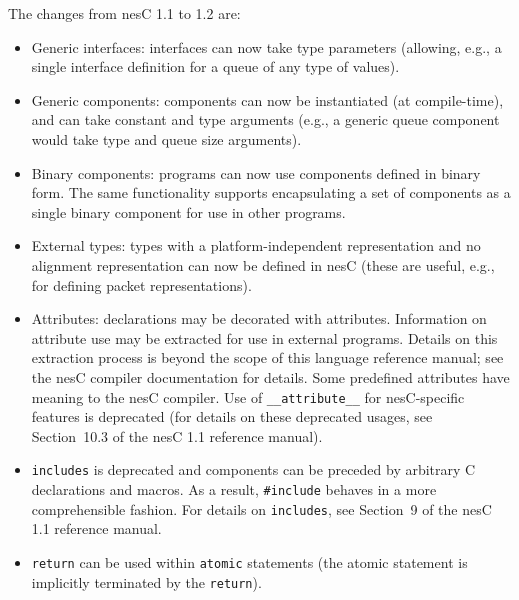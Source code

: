\documentclass[11pt,letterpaper]{article}
\newcommand{\kw}[1]{{\tt #1}}
\newcommand{\nesc}{nesC\xspace}
\begin{document}
The changes from \nesc 1.1 to 1.2 are:
\begin{itemize}
\item Generic interfaces: interfaces can now take type parameters
(allowing, e.g., a single interface definition for a queue of any type of
values).

\item Generic components: components can now be instantiated (at
compile-time), and can take constant and type arguments (e.g., a generic queue
component would take type and queue size arguments).

\item Binary components: programs can now use components defined in 
binary form. The same functionality supports encapsulating a set of
components as a single binary component for use in other programs.

\item External types: types with a platform-independent representation
and no alignment representation can now be defined in nesC (these
are useful, e.g., for defining packet representations).

\item Attributes: declarations may be decorated with attributes. 
Information on attribute use may be extracted for use in external
programs. Details on this extraction process is beyond the scope
of this language reference manual; see the nesC compiler documentation
for details. Some predefined attributes have meaning to the nesC
compiler. Use of \kw{\_\_attribute\_\_} for nesC-specific features
is deprecated (for details on these deprecated usages, see Section~10.3
of the nesC 1.1 reference manual).

\item \kw{includes} is deprecated and components can be preceded by
arbitrary C declarations and macros. As a result, \kw{\#include} behaves
in a more comprehensible fashion. For details on \kw{includes}, see
Section~9 of the nesC 1.1 reference manual.

\item \kw{return} can be used within \kw{atomic} statements (the atomic
statement is implicitly terminated by the \kw{return}).
\end{itemize}
\end{document}
